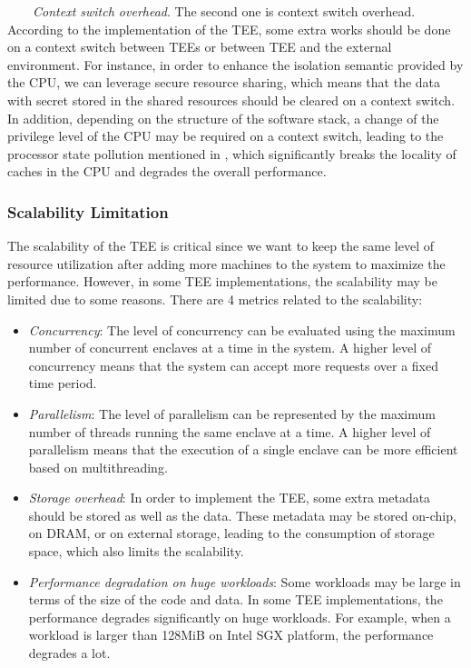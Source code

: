 \documentclass[12pt,twoside]{report}
\begin{document}
\ \ \ \ \textit{Context switch overhead}. The second one is context switch overhead. According to the implementation of the TEE, some extra works should be done on a context switch between TEEs or between TEE and the external environment. For instance, in order to enhance the isolation semantic provided by the CPU, we can leverage secure resource sharing, which means that the data with secret stored in the shared resources should be cleared on a context switch. In addition, depending on the structure of the software stack, a change of the privilege level of the CPU may be required on a context switch, leading to the processor state pollution mentioned in \cite{soares2010flexsc}, which significantly breaks the locality of caches in the CPU and degrades the overall performance.

\subsubsection{Scalability Limitation}

The scalability of the TEE is critical since we want to keep the same level of resource utilization after adding more machines to the system to maximize the performance. However, in some TEE implementations, the scalability may be limited due to some reasons. There are 4 metrics related to the scalability:

\begin{itemize}
    \item \textit{Concurrency}: The level of concurrency can be evaluated using the maximum number of concurrent enclaves at a time in the system. A higher level of concurrency means that the system can accept more requests over a fixed time period. 
    \item \textit{Parallelism}: The level of parallelism can be represented by the maximum number of threads running the same enclave at a time. A higher level of parallelism means that the execution of a single enclave can be more efficient based on multithreading.
    \item \textit{Storage overhead}: In order to implement the TEE, some extra metadata should be stored as well as the data. These metadata may be stored on-chip, on DRAM, or on external storage, leading to the consumption of storage space, which also limits the scalability.
    \item \textit{Performance degradation on huge workloads}: Some workloads may be large in terms of the size of the code and data. In some TEE implementations, the performance degrades significantly on huge workloads. For example, when a workload is larger than 128MiB on Intel SGX platform\cite{mckeen2013innovative}, the performance degrades a lot.
\end{itemize}
\end{document}
